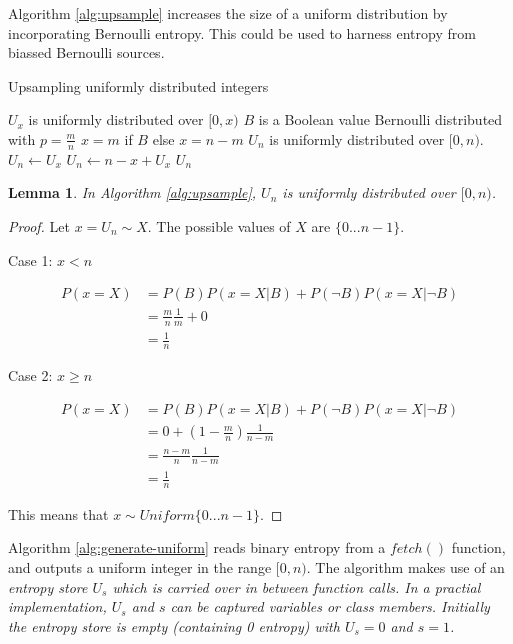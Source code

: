 \documentclass[12pt]{article}
\newtheorem{lemma}{Lemma}
\begin{document}
Algorithm \ref{alg:upsample} increases the size of a uniform distribution by incorporating Bernoulli entropy. This could be used to harness entropy from biassed Bernoulli sources.

\begin{algorithm}
\caption{Upsampling uniformly distributed integers}
\label{alg:upsample}
\begin{algorithmic}[1]
\Require $U_x$ is uniformly distributed over $[0,x)$
\Require $B$ is a Boolean value Bernoulli distributed with $p=\frac{m}{n}$
\Require $x=m$ if $B$ else $x=n-m$
\Ensure $U_n$ is uniformly distributed over $[0,n)$.
    \State $U_n \gets U_x$  
  \Else
    \State $U_n \gets n-x+U_x$  
  \EndIf
  \State \Return $U_n$
\EndProcedure
\end{algorithmic}
\end{algorithm}

\begin{lemma}
In Algorithm \ref{alg:upsample}, $U_{n}$ is uniformly distributed over $[0,n)$.
\end{lemma}

\begin{proof}
Let $x = U_{n} \sim X$. The possible values of $X$ are $\{0 ... n-1\}$.

Case 1: $x<n$

\begin{align}
P(x=X) & = P(B)P(x=X|B) + P(\neg B)P(x=X|\neg B) \\
       & = \frac{m}{n}\frac{1}{m} + 0 \\
       & = \frac{1}{n}
\end{align}

Case 2: $x \ge n$

\begin{align}
P(x=X) & = P(B)P(x=X|B) + P(\neg B)P(x=X|\neg B) \\
       & = 0 + (1 - \frac{m}{n})\frac{1}{n-m}  \\
       & = \frac{n - m}{n}\frac{1}{n-m} \\
       & = \frac{1}{n}
\end{align}

This means that $x \sim Uniform\{0...n-1\}$.
\end{proof}

Algorithm \ref{alg:generate-uniform} reads binary entropy from a $fetch()$ function, and outputs a uniform integer in the range $[0,n)$. The algorithm makes use of an \em entropy store \em $U_s$ which is carried over in between function calls. In a practial implementation, $U_s$ and $s$ can be captured variables or class members. Initially the entropy store is empty (containing 0 entropy) with $U_s = 0$ and $s=1$.
\end{document}
